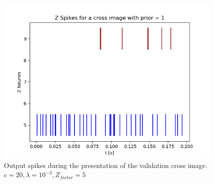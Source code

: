 \begin{figure}
  \includegraphics[width=\linewidth]{figures/horvert/horvert_c20_3_Zfactor5_crossZSpikes.png}
  \caption{Output spikes during the presentation of the validation cross image. $c = 20, \lambda = 10^{-3}, Z_{factor} = 5$}
  \label{fig:horvert_c20_3_Zfactor5_crossZSpikes}
\end{figure}

\fi